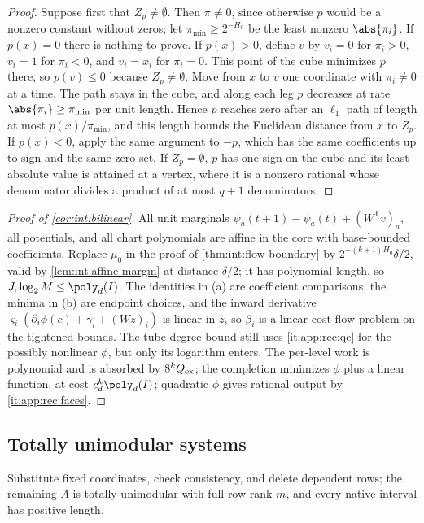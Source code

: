 \begin{proof}
Suppose first that $Z_p\ne\emptyset$. Then $\pi\ne0$, since otherwise $p$ would be a
nonzero constant without zeros; let $\pi_{\min}\ge2^{-H_0}$ be the least nonzero
$\abs{\pi_i}$. If $p(x)=0$ there is nothing to prove. If $p(x)>0$, define $v$ by $v_i=0$
for $\pi_i>0$, $v_i=1$ for $\pi_i<0$, and $v_i=x_i$ for $\pi_i=0$. This point of the cube
minimizes $p$ there, so $p(v)\le0$ because $Z_p\ne\emptyset$. Move from $x$ to $v$ one
coordinate with $\pi_i\ne0$ at a time. The path stays in the cube, and along each leg
$p$ decreases at rate $\abs{\pi_i}\ge\pi_{\min}$ per unit length. Hence $p$ reaches zero
after an $\ell_1$ path of length at most $p(x)/\pi_{\min}$, and this length bounds the
Euclidean distance from $x$ to $Z_p$. If $p(x)<0$, apply the same argument to $-p$,
which has the same coefficients up to sign and the same zero set. If $Z_p=\emptyset$, $p$
has one sign on the cube and its least absolute value is attained at a vertex, where
it is a nonzero rational whose denominator divides a product of at most $q+1$
denominators.
\end{proof}

\begin{proof}[Proof of \cref{cor:int:bilinear}]
All unit marginals $\psi_a(t+1)-\psi_a(t)+(W^{\mathsf T}v)_a$, all potentials, and all
chart polynomials are affine in the core with base-bounded coefficients. Replace
$\mu_0$ in the proof of \cref{thm:int:flow-boundary} by
$2^{-(k+1)H_0}\delta/2$, valid by \cref{lem:int:affine-margin} at distance $\delta/2$;
it has polynomial length, so $J,\log_2M\le\poly_d(I)$. The identities in (a) are
coefficient comparisons, the minima in (b) are endpoint choices, and the inward
derivative $\varsigma_i(\partial_i\phi(c)+\gamma_i+(Wz)_i)$ is linear in $z$, so $\beta_i$
is a linear-cost flow problem on the tightened bounds. The tube degree bound still uses
\ref{it:app:rec:qe} for the possibly nonlinear $\phi$, but only its logarithm enters. The
per-level work is polynomial and is absorbed by $8^kQ_{\rm ex}$; the completion
minimizes $\phi$ plus a linear function, at cost $c_d^k\poly_d(I)$; quadratic $\phi$
gives rational output by \ref{it:app:rec:faces}.
\end{proof}

\subsection{Totally unimodular systems}\label{app:int:tu}

Substitute fixed coordinates, check consistency, and delete dependent rows; the
remaining $A$ is totally unimodular with full row rank $m$, and every native interval
has positive length.

